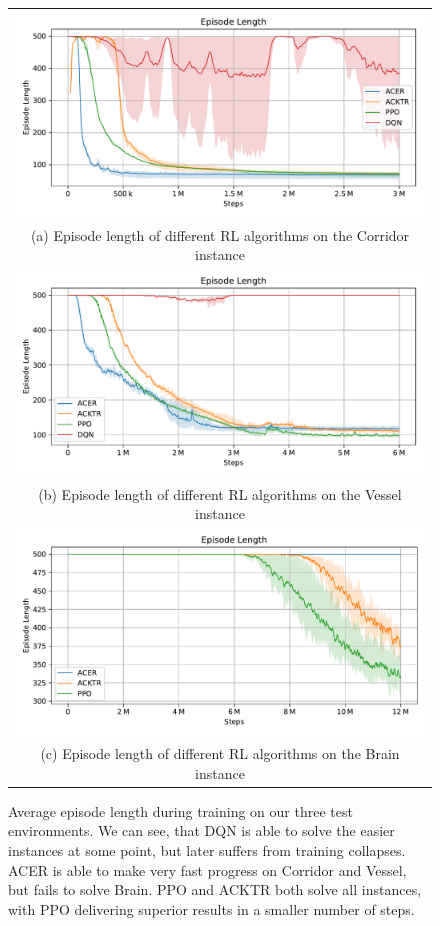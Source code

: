 \begin{figure}[htp]
    \begin{center}
        \begin{tabular}{c}
            \includegraphics[clip, width=0.75\columnwidth]{figures/evaluation/algorithms/maze0318_episode_length.pdf} \\
            {\small (a) Episode length of different RL algorithms on the Corridor instance} \\
            \includegraphics[clip, width=0.75\columnwidth]{figures/evaluation/algorithms/vesselmaze02_episode_length.pdf} \\
            {\small (b) Episode length of different RL algorithms on the Vessel instance} \\
            \includegraphics[clip, width=0.75\columnwidth]{figures/evaluation/algorithms/maze0122_episode_length.pdf} \\
            {\small (c) Episode length of different RL algorithms on the Brain instance} \\
        \end{tabular}
    \end{center}
    \caption[Episode Length During Training on the Test Environment]{Average episode length during training on our three test environments. We can see, that DQN is able to solve the easier instances at some point, but later suffers from training collapses. ACER is able to make very fast progress on Corridor and Vessel, but fails to solve Brain. PPO and ACKTR both solve all instances, with PPO delivering superior results in a smaller number of steps.} \label{fig:Algorithm/Ep_Length}
\end{figure}


